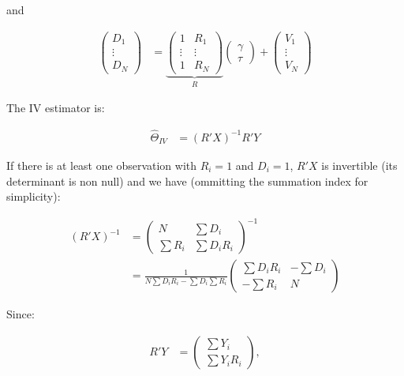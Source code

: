 \documentclass[]{book}
\theoremstyle{definition}
\theoremstyle{definition}
\theoremstyle{definition}
\theoremstyle{remark}
\begin{document}
and

\begin{align*}
  \left(\begin{array}{c}  D_1 \\    \vdots \\   D_N \end{array}\right) & =
  \underbrace{\left(\begin{array}{cc}   1 & R_1\\   \vdots & \vdots\\   1 & R_N\end{array}\right)}_{R}
  \left(\begin{array}{c}    \gamma \\   \tau \end{array}\right)+
  \left(\begin{array}{c}    V_1 \\  \vdots \\   V_N \end{array}\right)
\end{align*}

The IV estimator is:

\begin{align*}
    \hat{\Theta}_{IV} &  = (R'X)^{-1}R'Y
\end{align*}

If there is at least one observation with \(R_i=1\) and \(D_i=1\),
\(R'X\) is invertible (its determinant is non null) and we have
(ommitting the summation index for simplicity):

\begin{align*}
(R'X)^{-1} &  = \left(\begin{array}{cc} N & \sum D_i \\ \sum R_i & \sum D_iR_i \end{array}\right)^{-1} \\
                & = \frac{1}{N\sum D_iR_i-\sum D_i\sum R_i}\left(\begin{array}{cc} \sum D_iR_i & -\sum D_i \\ -\sum R_i & N \end{array}\right)
\end{align*}

Since:

\begin{align*}
R'Y &  = \left(\begin{array}{c} \sum Y_i \\ \sum Y_iR_i \end{array}\right),
\end{align*}
\end{document}
